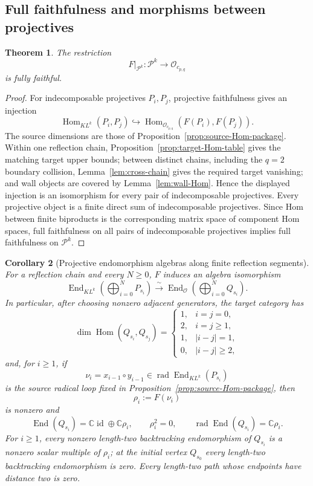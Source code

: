 \documentclass[12pt,leqno]{amsart}
\numberwithin{equation}{section}
\newtheorem{thm}{Theorem}[section]
\newtheorem{cor}[thm]{Corollary}
\newcommand{\End}{\operatorname{End}}
\newcommand{\Hom}{\operatorname{Hom}}
\newcommand{\rad}{\operatorname{rad}}
\newcommand{\id}{\operatorname{id}}
\newcommand{\KL}{KL}
\newcommand{\Oc}{\mathcal O}
\def\C{\mathbb{C}}
\begin{document}
\subsection{Full faithfulness and morphisms between projectives}

\begin{thm}\label{thm:F-fully-faithful}
The restriction
\[
 F|_{\mathcal P^k}:\mathcal P^k\longrightarrow\Oc_{c_{p,q}}
\]
is fully faithful.
\end{thm}

\begin{proof}
For indecomposable projectives $P_i,P_j$, projective faithfulness gives
an injection
\[
 \Hom_{\KL^k}(P_i,P_j)
 \hookrightarrow
 \Hom_{\Oc_{c_{p,q}}}(F(P_i),F(P_j)).
\]
The source dimensions are those of
Proposition~\ref{prop:source-Hom-package}.  Within one reflection chain,
Proposition~\ref{prop:target-Hom-table} gives the matching target upper
bounds; between distinct chains, including the $q=2$ boundary collision,
Lemma~\ref{lem:cross-chain} gives the required target vanishing; and wall
objects are covered by Lemma~\ref{lem:wall-Hom}.  Hence the displayed
injection is an isomorphism for every pair of indecomposable projectives.
Every projective object is a finite direct sum of indecomposable
projectives.  Since Hom between finite biproducts is the corresponding
matrix space of component Hom spaces, full faithfulness on all pairs of
indecomposable projectives implies full faithfulness on $\mathcal P^k$.
\end{proof}

\begin{cor}[Projective endomorphism algebras along finite reflection segments]\label{cor:finite-zigzag-algebra}
For a reflection chain and every $N\ge0$, $F$ induces an algebra
isomorphism
\[
 \End_{\KL^k}\!\left(\bigoplus_{i=0}^N P_{s_i}\right)
 \xrightarrow{\ \sim\ }
 \End_{\Oc}\!\left(\bigoplus_{i=0}^N Q_{s_i}\right).
\]
In particular, after choosing nonzero adjacent generators, the target
category has
\[
 \dim\Hom(Q_{s_i},Q_{s_j})=
 \begin{cases}
  1,&i=j=0,\\
  2,&i=j\ge1,\\
  1,&|i-j|=1,\\
  0,&|i-j|\ge2,
 \end{cases}
\]
and, for $i\ge1$, if
\[
 \nu_i=x_{i-1}\circ y_{i-1}
 \in\rad\End_{\KL^k}(P_{s_i})
\]
is the source radical loop fixed in
Proposition~\ref{prop:source-Hom-package}, then
\[
 \rho_i:=F(\nu_i)
\]
is nonzero and
\[
 \End(Q_{s_i})=\C\id\oplus\C\rho_i,
 \qquad \rho_i^2=0,
 \qquad \rad\End(Q_{s_i})=\C\rho_i.
\]
For $i\ge1$, every nonzero length-two backtracking endomorphism of
$Q_{s_i}$ is a nonzero scalar multiple of $\rho_i$; at the initial vertex
$Q_{s_0}$ every length-two backtracking endomorphism is zero.  Every
length-two path whose endpoints have distance two is zero.
\end{cor}
\end{document}

